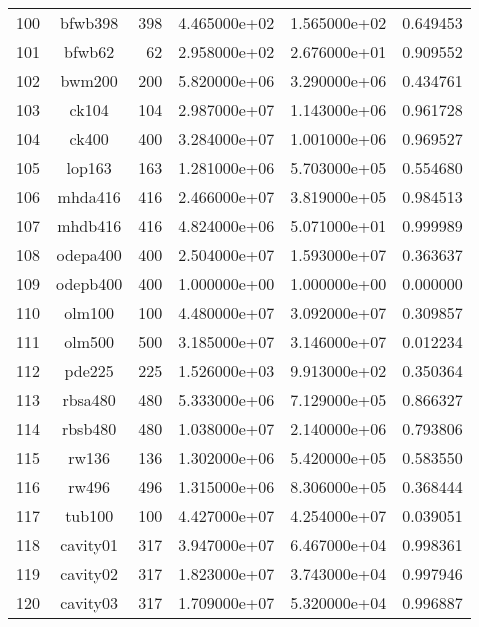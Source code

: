 \documentclass[8pt]{report}
\begin{document}
\begin{table*}
\begin{tabular}{|l|c|r|r|r|r|}
100 &                  bfwb398 &   398 &  4.465000e+02 &  1.565000e+02 &  0.649453 \\
101 &                   bfwb62 &    62 &  2.958000e+02 &  2.676000e+01 &  0.909552 \\
102 &                   bwm200 &   200 &  5.820000e+06 &  3.290000e+06 &  0.434761 \\
103 &                    ck104 &   104 &  2.987000e+07 &  1.143000e+06 &  0.961728 \\
104 &                    ck400 &   400 &  3.284000e+07 &  1.001000e+06 &  0.969527 \\
105 &                   lop163 &   163 &  1.281000e+06 &  5.703000e+05 &  0.554680 \\
106 &                  mhda416 &   416 &  2.466000e+07 &  3.819000e+05 &  0.984513 \\
107 &                  mhdb416 &   416 &  4.824000e+06 &  5.071000e+01 &  0.999989 \\
108 &                 odepa400 &   400 &  2.504000e+07 &  1.593000e+07 &  0.363637 \\
109 &                 odepb400 &   400 &  1.000000e+00 &  1.000000e+00 &  0.000000 \\
110 &                   olm100 &   100 &  4.480000e+07 &  3.092000e+07 &  0.309857 \\
111 &                   olm500 &   500 &  3.185000e+07 &  3.146000e+07 &  0.012234 \\
112 &                   pde225 &   225 &  1.526000e+03 &  9.913000e+02 &  0.350364 \\
113 &                  rbsa480 &   480 &  5.333000e+06 &  7.129000e+05 &  0.866327 \\
114 &                  rbsb480 &   480 &  1.038000e+07 &  2.140000e+06 &  0.793806 \\
115 &                    rw136 &   136 &  1.302000e+06 &  5.420000e+05 &  0.583550 \\
116 &                    rw496 &   496 &  1.315000e+06 &  8.306000e+05 &  0.368444 \\
117 &                   tub100 &   100 &  4.427000e+07 &  4.254000e+07 &  0.039051 \\
118 &                 cavity01 &   317 &  3.947000e+07 &  6.467000e+04 &  0.998361 \\
119 &                 cavity02 &   317 &  1.823000e+07 &  3.743000e+04 &  0.997946 \\
120 &                 cavity03 &   317 &  1.709000e+07 &  5.320000e+04 &  0.996887 \\

\end{tabular}
\end{table*}
\end{document}
